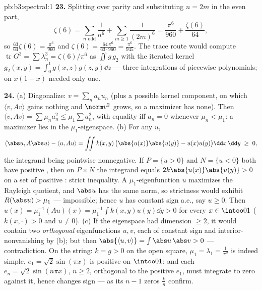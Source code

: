 \begin{solution}{pb:b3:spectral:1}
\textbf{23.} Splitting over parity and substituting $n = 2m$
in the even part,
\[
\zeta(6) = \sum_{n\text{ odd}}\frac1{n^6} +
\sum_{m\geq1}\frac1{(2m)^6}
= \frac{\pi^6}{960} + \frac{\zeta(6)}{64},
\]
so $\frac{63}{64}\zeta(6) = \frac{\pi^6}{960}$ and $\zeta(6)
= \frac{64\,\pi^6}{63\cdot960} = \frac{\pi^6}{945}$. The
trace route would compute $\operatorname{tr}G^3 =
\sum\lambda_n^3 = \zeta(6)/\pi^6$ as $\iint g\,g_2$ with the
iterated kernel $g_2(x,y) = \int_0^1g(x,z)g(z,y)\dd z$ ---
three integrations of piecewise polynomials;  on
$x(1-x)$ needed only one.

\textbf{24.} (a) Diagonalize: $v = \sum_na_nu_n$ (plus a
possible kernel component, on which $\langle v, Av\rangle$
gains nothing and $\norm v^2$ grows, so a maximizer has
none). Then $\langle v, Av\rangle = \sum\mu_na_n^2 \leq
\mu_1\sum a_n^2$, with equality iff $a_n = 0$ whenever
$\mu_n < \mu_1$: a maximizer lies in the
$\mu_1$-eigenspace. (b) For any $u$,
\[
\langle\abs u, A\abs u\rangle - \langle u, Au\rangle
= \iint k(x,y)\,\bigl(\abs{u(x)}\abs{u(y)} -
u(x)u(y)\bigr)\dd x\,\dd y \;\geq\; 0,
\]
the integrand being pointwise nonnegative. If $P = \{u >
0\}$ and $N = \{u < 0\}$ both have positive , then on
$P\times N$ the integrand equals $2k\abs{u(x)}\abs{u(y)} >
0$ on a set of positive : strict inequality. A
$\mu_1$-eigenfunction $u$ maximizes the Rayleigh quotient,
and $\abs u$ has the same norm, so strictness would exhibit
$R(\abs u) > \mu_1$ --- impossible; hence $u$ has constant
sign a.e., say $u \geq 0$. Then $u(x) = \mu_1^{-1}(Au)(x) =
\mu_1^{-1}\int k(x,y)u(y)\dd y > 0$ for every $x \in
\intoo01$ ($k(x,\cdot) > 0$ and $u \neq 0$). (c) If the
eigenspace had dimension $\geq 2$, it would contain two
\emph{orthogonal} eigenfunctions $u, v$, each of constant
sign and interior-nonvanishing by (b); but then
$\abs{\langle u, v\rangle} = \int\abs u\,\abs v > 0$ ---
contradiction. On the string: $k = g > 0$ on the open
square, $\mu_1 = \lambda_1 = \frac1{\pi^2}$ is indeed
simple, $e_1 = \sqrt2\sin(\pi x)$ is positive on
$\intoo01$; and each $e_n = \sqrt2\sin(n\pi x)$, $n \geq 2$,
orthogonal to the positive $e_1$, must integrate to zero
against it, hence changes sign --- as its $n - 1$ 
zeros $\frac kn$ confirm.


\end{solution}
